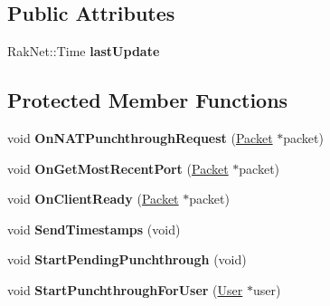 \subsection*{Public Attributes}
\begin{DoxyCompactItemize}
\item 
\hypertarget{class_rak_net_1_1_nat_punchthrough_server_a9ece181b69c0a702655dae5a6fd11745}{Rak\-Net\-::\-Time {\bfseries last\-Update}}\label{class_rak_net_1_1_nat_punchthrough_server_a9ece181b69c0a702655dae5a6fd11745}

\end{DoxyCompactItemize}
\subsection*{Protected Member Functions}
\begin{DoxyCompactItemize}
\item 
\hypertarget{class_rak_net_1_1_nat_punchthrough_server_a21fe5e72e337b8514a194cd0a5f27133}{void {\bfseries On\-N\-A\-T\-Punchthrough\-Request} (\hyperlink{struct_rak_net_1_1_packet}{Packet} $\ast$packet)}\label{class_rak_net_1_1_nat_punchthrough_server_a21fe5e72e337b8514a194cd0a5f27133}

\item 
\hypertarget{class_rak_net_1_1_nat_punchthrough_server_a8ceb4ea3fd96770146b2b31f8760f6e0}{void {\bfseries On\-Get\-Most\-Recent\-Port} (\hyperlink{struct_rak_net_1_1_packet}{Packet} $\ast$packet)}\label{class_rak_net_1_1_nat_punchthrough_server_a8ceb4ea3fd96770146b2b31f8760f6e0}

\item 
\hypertarget{class_rak_net_1_1_nat_punchthrough_server_aa6817c24f646846604fc402c86280be7}{void {\bfseries On\-Client\-Ready} (\hyperlink{struct_rak_net_1_1_packet}{Packet} $\ast$packet)}\label{class_rak_net_1_1_nat_punchthrough_server_aa6817c24f646846604fc402c86280be7}

\item 
\hypertarget{class_rak_net_1_1_nat_punchthrough_server_ab7e8378e47f4dea7c466fe66a91a1d79}{void {\bfseries Send\-Timestamps} (void)}\label{class_rak_net_1_1_nat_punchthrough_server_ab7e8378e47f4dea7c466fe66a91a1d79}

\item 
\hypertarget{class_rak_net_1_1_nat_punchthrough_server_a03f71767b234982f688f8387b2b78293}{void {\bfseries Start\-Pending\-Punchthrough} (void)}\label{class_rak_net_1_1_nat_punchthrough_server_a03f71767b234982f688f8387b2b78293}

\item 
\hypertarget{class_rak_net_1_1_nat_punchthrough_server_ad50e598c0175e09e7e17fb85d1e02687}{void {\bfseries Start\-Punchthrough\-For\-User} (\hyperlink{struct_rak_net_1_1_nat_punchthrough_server_1_1_user}{User} $\ast$user)}\label{class_rak_net_1_1_nat_punchthrough_server_ad50e598c0175e09e7e17fb85d1e02687}

\end{DoxyCompactItemize}
